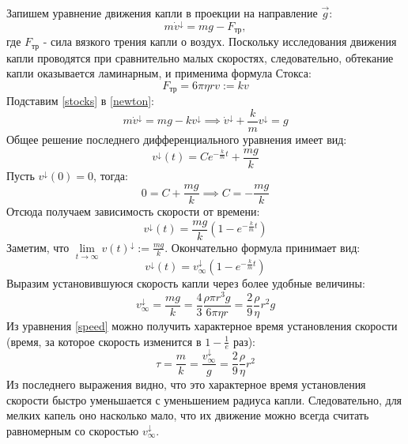 \documentclass[14pt, a4paper,reqno]{article}
\begin{document}
    Запишем уравнение движения капли в проекции на направление $\vec{g}$:
    \begin{equation}\label{newton}
        m\dot{v}^{\downarrow} = mg - F_{тр},
    \end{equation}
    где $F_{тр}$ - сила вязкого трения капли о воздух. Поскольку исследования
    движения капли проводятся при сравнительно малых скоростях, следовательно,
    обтекание капли оказывается ламинарным, и применима формула Стокса:
    \begin{equation}\label{stocks}
        F_{тр} = 6\pi\eta rv := kv
    \end{equation}
    Подставим \eqref{stocks} в \eqref{newton}:
    \begin{equation*}
        m\dot{v}^{\downarrow} = mg - kv^{\downarrow} \implies \dot{v}^{\downarrow} + \frac{k}{m}v^{\downarrow} = g
    \end{equation*}
    Общее решение последнего дифференциального уравнения имеет вид:
    \begin{equation*}
        v^{\downarrow}(t) = Ce^{-\frac{k}{m}t} + \frac{mg}{k}
    \end{equation*}
    Пусть $v^{\downarrow}(0) = 0$, тогда:
    \begin{equation*}
        0 = C + \frac{mg}{k} \implies C = -\frac{mg}{k}
    \end{equation*}
    Отсюда получаем зависимость скорости от времени:
    \begin{equation*}
        v^{\downarrow}(t) = \frac{mg}{k} \left(1 - e^{-\frac{k}{m}t}\right)
    \end{equation*}
    Заметим, что $\lim\limits_{t \to\infty } v(t)^{\downarrow} := \frac{mg}{k}$. Окончательно формула принимает вид:
    \begin{equation}\label{speed}
        v^{\downarrow}(t) = v_{\infty}^{\downarrow} \left(1 - e^{-\frac{k}{m}t}\right)
    \end{equation}
    Выразим установившуюся скорость капли через более удобные величины:
    \begin{equation*}
        v_{\infty}^{\downarrow} = \frac{mg}{k} = \frac{4}{3}\frac{\rho \pi r^3 g}{6\pi\eta r} = \frac{2}{9}\frac{\rho}{\eta}r^2 g
    \end{equation*}
    Из уравнения \eqref{speed} можно получить характерное время установления скорости (время, за которое скорость 
    изменится в $1 - \frac{1}{e}$ раз):
    \begin{equation*}
        \tau = \frac{m}{k} = \frac{v_{\infty}^{\downarrow}}{g} = \frac{2}{9}\frac{\rho}{\eta}r^2
    \end{equation*}
    Из последнего выражения видно, что это характерное время установления скорости быстро уменьшается с уменьшением
    радиуса капли. Следовательно, для мелких капель оно насколько мало, что их движение можно всегда считать равномерным
    со скоростью $v_{\infty}^{\downarrow}$.
\end{document}
